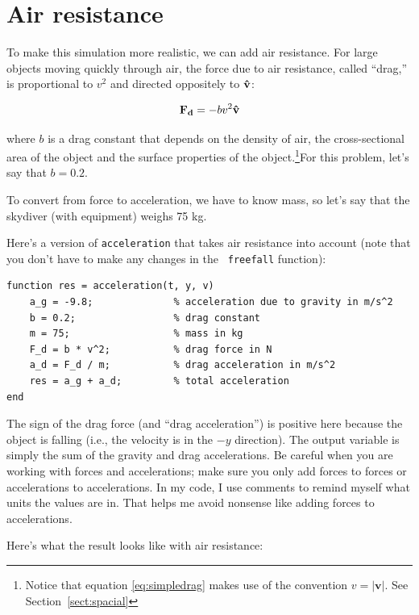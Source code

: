 \documentclass[
]{book}
\renewcommand{\vec}[1]{\bm{\mathbf{#1}}}
\newcommand{\uveci}{{\bm{\hat{\textnormal{\bfseries\i}}}}}
\newcommand{\uvecj}{{\bm{\hat{\textnormal{\bfseries\j}}}}}
\newcommand{\uvec}[1]{%
    \ifthenelse{\equal{#1}{i}}%
        {\uveci}{%
    \ifthenelse{\equal{#1}{j}}%
        {\uvecj}{%
    {\bm{\hat{\mathbf{#1}}}}%
}}}
\newcommand{\norm}[1]{\lvert #1 \rvert}
\begin{document}
\section{Air resistance}
\label{sect:air_resistance}

To make this simulation more realistic, we can add air resistance.
For large objects moving quickly through air, the force due to air
resistance, called ``drag,'' is proportional to $v^2$ and directed
oppositely to $\uvec{v}$:

\begin{equation}\label{eq:simpledrag}
    \vec{F_{d}} = - b v^2 \uvec{v}
\end{equation}

where $b$ is a drag constant that depends on the density of
air, the cross-sectional area of the object and the surface properties
of the object.\footnote{Notice that equation \eqref{eq:simpledrag} makes use
of the convention $v = \norm{\vec{v}}$. See
Section~\ref{sect:spacial}}For this problem, let's say that $b = 0.2$.

To convert from force to acceleration, we have to know mass, so let's
say that the skydiver (with equipment) weighs 75 kg.

Here's a version of {\tt acceleration} that takes air resistance into
account (note that you don't have to make any changes in the {\tt
freefall} function):

\begin{verbatim}
function res = acceleration(t, y, v)
    a_g = -9.8;              % acceleration due to gravity in m/s^2
    b = 0.2;                 % drag constant
    m = 75;                  % mass in kg
    F_d = b * v^2;           % drag force in N
    a_d = F_d / m;           % drag acceleration in m/s^2
    res = a_g + a_d;         % total acceleration
end
\end{verbatim}

The sign of the drag force (and ``drag acceleration'') is positive here because
the object is falling (i.e., the velocity is in the $-y$ direction).
The output variable is simply the sum of the gravity and drag accelerations.
Be careful when you are working with forces and accelerations; make sure
you only add forces to forces or accelerations to accelerations.  In my
code, I use comments to remind myself what units the values are in.
That helps me avoid nonsense like adding forces to accelerations.

Here's what the result looks like with air resistance:
\end{document}

